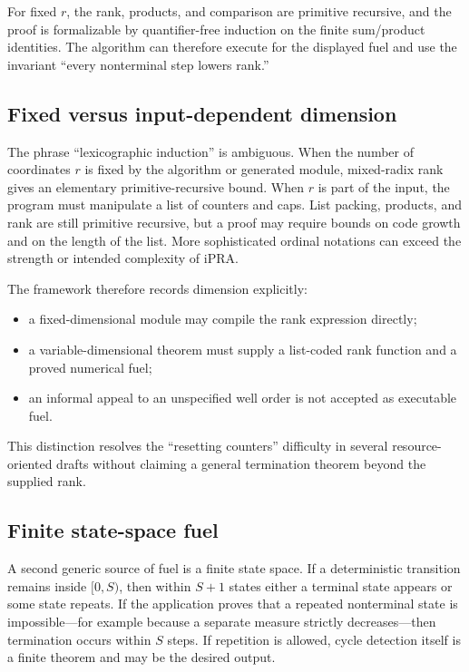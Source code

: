 For fixed \(r\), the rank, products, and comparison are primitive recursive, and the proof is formalizable
by quantifier-free induction on the finite sum/product identities.  The algorithm can therefore execute for
the displayed fuel and use the invariant ``every nonterminal step lowers rank.''

\subsection{Fixed versus input-dependent dimension}

The phrase ``lexicographic induction'' is ambiguous.  When the number of coordinates \(r\) is fixed by the
algorithm or generated module, mixed-radix rank gives an elementary primitive-recursive bound.  When \(r\)
is part of the input, the program must manipulate a list of counters and caps.  List packing, products, and
rank are still primitive recursive, but a proof may require bounds on code growth and on the length of the
list.  More sophisticated ordinal notations can exceed the strength or intended complexity of iPRA.

The framework therefore records dimension explicitly:
\begin{itemize}
  \item a fixed-dimensional module may compile the rank expression directly;
  \item a variable-dimensional theorem must supply a list-coded rank function and a proved numerical fuel;
  \item an informal appeal to an unspecified well order is not accepted as executable fuel.
\end{itemize}
This distinction resolves the ``resetting counters'' difficulty in several resource-oriented drafts without
claiming a general termination theorem beyond the supplied rank.

\subsection{Finite state-space fuel}

A second generic source of fuel is a finite state space.  If a deterministic transition remains inside
\([0,S)\), then within \(S+1\) states either a terminal state appears or some state repeats.  If the
application proves that a repeated nonterminal state is impossible---for example because a separate measure
strictly decreases---then termination occurs within \(S\) steps.  If repetition is allowed, cycle detection
itself is a finite theorem and may be the desired output.

